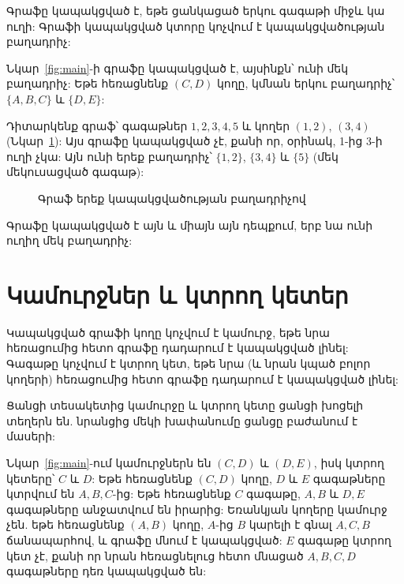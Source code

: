 \begin{definition}
Գրաֆը կապակցված է, եթե ցանկացած երկու գագաթի միջև կա ուղի: Գրաֆի կապակցված կտորը կոչվում է կապակցվածության բաղադրիչ:
\end{definition}

Նկար~\ref{fig:main}-ի գրաֆը կապակցված է, այսինքն՝ ունի մեկ բաղադրիչ: Եթե հեռացնենք $(C,D)$ կողը, կմնան երկու բաղադրիչ՝ $\{A,B,C\}$ և $\{D,E\}$:

\begin{example}
Դիտարկենք գրաֆ՝ գագաթներ $1,2,3,4,5$ և կողեր $(1,2)$, $(3,4)$ (Նկար~\ref{fig:comp}): Այս գրաֆը կապակցված չէ, քանի որ, օրինակ, 1-ից 3-ի ուղի չկա: Այն ունի երեք բաղադրիչ՝ $\{1,2\}$, $\{3,4\}$ և $\{5\}$ (մեկ մեկուսացված գագաթ):
\end{example}

\begin{figure}[h]
\centering
{}
\caption{Գրաֆ երեք կապակցվածության բաղադրիչով}\label{fig:comp}
\end{figure}

Գրաֆը կապակցված է այն և միայն այն դեպքում, երբ նա ունի ուղիղ մեկ բաղադրիչ:

\section{Կամուրջներ և կտրող կետեր}

\begin{definition}
Կապակցված գրաֆի կողը կոչվում է կամուրջ, եթե նրա հեռացումից հետո գրաֆը դադարում է կապակցված լինել: Գագաթը կոչվում է կտրող կետ, եթե նրա (և նրան կպած բոլոր կողերի) հեռացումից հետո գրաֆը դադարում է կապակցված լինել:
\end{definition}

Ցանցի տեսակետից կամուրջը և կտրող կետը ցանցի խոցելի տեղերն են. նրանցից մեկի խափանումը ցանցը բաժանում է մասերի:

\begin{example}
Նկար~\ref{fig:main}-ում կամուրջներն են $(C,D)$ և $(D,E)$, իսկ կտրող կետերը՝ $C$ և $D$: Եթե հեռացնենք $(C,D)$ կողը, $D$ և $E$ գագաթները կտրվում են $A,B,C$-ից: Եթե հեռացնենք $C$ գագաթը, $A,B$ և $D,E$ գագաթները անջատվում են իրարից: Եռանկյան կողերը կամուրջ չեն. եթե հեռացնենք $(A,B)$ կողը, $A$-ից $B$ կարելի է գնալ $A,C,B$ ճանապարհով, և գրաֆը մնում է կապակցված: $E$ գագաթը կտրող կետ չէ, քանի որ նրան հեռացնելուց հետո մնացած $A,B,C,D$ գագաթները դեռ կապակցված են:
\end{example}

